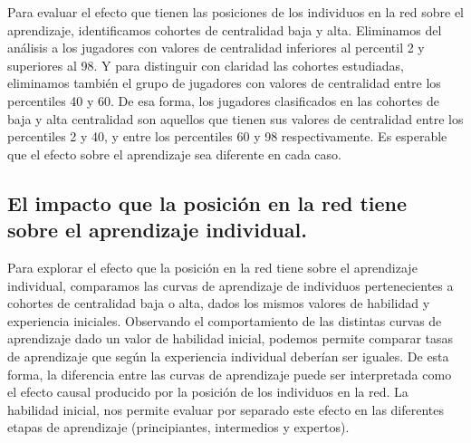 \documentclass[a4paper,11pt]{book}
\theoremstyle{definition}
\begin{document}

Para evaluar el efecto que tienen las posiciones de los individuos en la red sobre el aprendizaje, identificamos cohortes de centralidad baja y alta.
Eliminamos del an\'alisis a los jugadores con valores de centralidad inferiores al percentil 2 y superiores al 98.
%
Y para distinguir con claridad las cohortes estudiadas, eliminamos tambi\'en el grupo de jugadores con valores de centralidad entre los percentiles 40 y 60.
%
De esa forma, los jugadores clasificados en las cohortes de baja y alta centralidad son aquellos que tienen sus valores de centralidad entre los percentiles 2 y 40, y entre los percentiles 60 y 98 respectivamente.
%
Es esperable que el efecto sobre el aprendizaje sea diferente en cada caso.


\subsection{El impacto que la posici\'on en la red tiene sobre el aprendizaje individual.} \label{sec:efecto_topologia}



Para explorar el efecto que la posici\'on en la red tiene sobre el aprendizaje individual, comparamos las curvas de aprendizaje de individuos pertenecientes a cohortes de centralidad baja o alta, dados los mismos valores de habilidad y experiencia iniciales.
%
Observando el comportamiento de las distintas curvas de aprendizaje dado un valor de habilidad inicial, podemos permite comparar tasas de aprendizaje que seg\'un la experiencia individual deber\'ian ser iguales.
%
De esta forma, la diferencia entre las curvas de aprendizaje puede ser interpretada como el efecto causal producido por la posici\'on de los individuos en la red.
%
La habilidad inicial, nos permite evaluar por separado este efecto en las diferentes etapas de aprendizaje (principiantes, intermedios y expertos).

\end{document}
